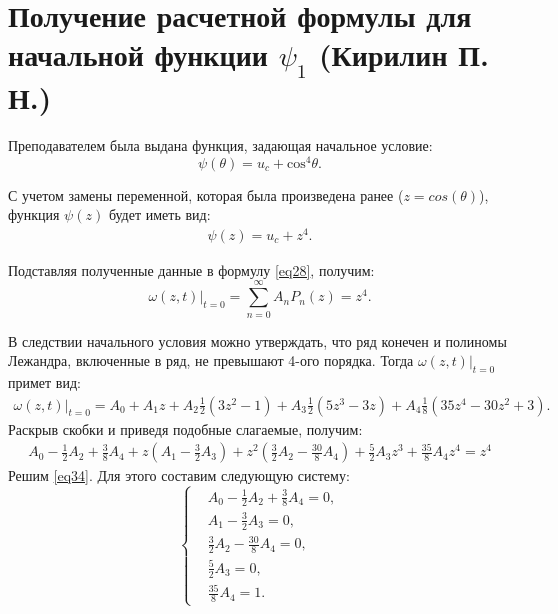 \newpage
\section{Получение расчетной формулы для начальной функции  \texorpdfstring{$\psi_1$}{TEXT} (Кирилин П. Н.)}
{

Преподавателем была выдана функция, задающая начальное условие:
    \begin{equation}
        \psi(\theta) = u_c + \text{cos}^4\theta.     
    \end{equation}
    
    С учетом замены переменной, которая была произведена ранее ($z = cos(\theta)$), функция $\psi(z)$ будет иметь вид: 
    \begin{align*}
        \psi(z) = u_c + z^4.
    \end{align*}
    
    Подставляя полученные данные в формулу \eqref{eq28}, получим:    
    \begin{equation}
      \omega(z,t)|_{t=0} = \sum_{n=0}^{\infty}{A_n P_n(z)} = z^4.
    \end{equation}
    
    В следствии начального условия можно утверждать, что ряд конечен 
    и полиномы Лежандра, включенные в ряд, не превышают 4-ого порядка.
    Тогда $\omega(z, t)|_{t=0}$ примет вид:
    \begin{align}
        \omega(z, t)|_{t=0} =  A_0 + A_1 z + A_2 \frac{1}{2}(3z^2-1) + A_3 \frac{1}{2}(5z^3-3z) + A_4 \frac{1}{8}(35z^4-30z^2+3).
    \end{align}
    Раскрыв скобки и приведя подобные слагаемые, получим:
    \begin{align}\label{eq34}
        A_0 - \frac{1}{2}A_2 + \frac{3}{8}A_4 + z(A_1 - \frac{3}{2}A_3) + z^2(\frac{3}{2}A_2 - \frac{30}{8}A_4) +
        \frac{5}{2}A_3 z^3 + \frac{35}{8} A_4 z^4 = z^4
    \end{align}
    Решим \eqref{eq34}. Для этого составим следующую систему:
    \begin{equation}\label{eq35}
    \left\{
    \begin{split}
     &A_0 - \frac{1}{2}A_2 + \frac{3}{8}A_4  = 0, \\
     &A_1 - \frac{3}{2}A_3 = 0, \\
     &\frac{3}{2}A_2 - \frac{30}{8}A_4 = 0, \\
     &\frac{5}{2}A_3 = 0, \\
     &\frac{35}{8} A_4 = 1.
    \end{split}
    \right.
    \end{equation} 
    
}
